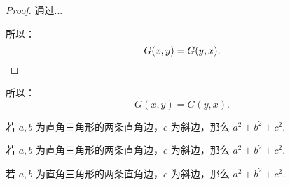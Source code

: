 \begin{proof}
{
    通过...

    所以：
    \begin{equation*}
        G(x, y) = G(y, x).  \qedhere
    \end{equation*}
}
\end{proof}

\begin{proposition}
    所以：
    \begin{equation*}
        G(x, y) = G(y, x).
    \end{equation*}
\end{proposition}


\begin{conjecture}[勾股定理]
    若 $a,b$ 为直角三角形的两条直角边，$c$ 为斜边，那么 $a^2 + b^2 + c^2.$
\end{conjecture}

\begin{axiom}[勾股定理]
    若 $a,b$ 为直角三角形的两条直角边，$c$ 为斜边，那么 $a^2 + b^2 + c^2.$
\end{axiom}

\begin{definition}[勾股定理]
    若 $a,b$ 为直角三角形的两条直角边，$c$ 为斜边，那么 $a^2 + b^2 + c^2.$
\end{definition}




